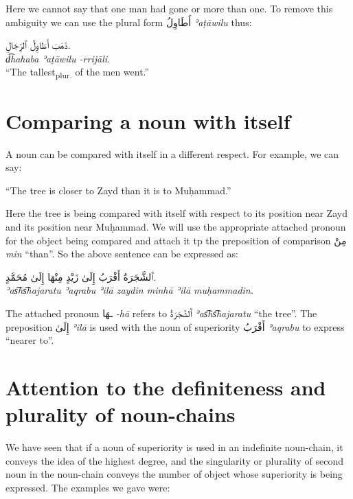 \documentclass[
  10pt,
]{book}
\begin{document}
Here we cannot say that one man had gone or more than one. To remove this ambiguity we can use the plural form \foreignlanguage{arabic}{أَطَاوِلُ} \emph{ʾaṭāwilu} thus:

\foreignlanguage{arabic}{ذَهَبَ أَطَاوِلُ ٱلرِّجَالِ.}\\
\emph{d͡hahaba ʾaṭāwilu -rrijāli.}\\
\enquote{The tallest\textsubscript{plur.} of the men went.}

\section{Comparing a noun with itself}\label{comparing-a-noun-with-itself}

A noun can be compared with itself in a different respect. For example, we can say:

\enquote{The tree is closer to Zayd than it is to Muḥammad.}

Here the tree is being compared with itself with respect to its position near Zayd and its position near Muḥammad. We will use the appropriate attached pronoun for the object being compared and attach it tp the preposition of comparison \foreignlanguage{arabic}{مِنْ} \emph{min} \enquote{than}. So the above sentence can be expressed as:

\foreignlanguage{arabic}{ٱَلشَّجَرَةُ أَقْرَبُ إِلَىٰ زَيْدٍ مِنْهَا إِلَىٰ مُحَمَّدٍ.}\\
\emph{ʾas͡hs͡hajaratu ʾaqrabu ʾilā zaydin minhā ʾilā muḥammadin.}

The attached pronoun \foreignlanguage{arabic}{ـهَا} \emph{-hā} refers to \foreignlanguage{arabic}{ٱَلشَّجَرَةُ} \emph{ʾas͡hs͡hajaratu} \enquote{the tree}.
The preposition \foreignlanguage{arabic}{إِلَىٰ} \emph{ʾilā} is used with the noun of superiority \foreignlanguage{arabic}{أَقْرَبُ} \emph{ʾaqrabu} to express \enquote{nearer to}.

\section{Attention to the definiteness and plurality of noun-chains}\label{attention-to-the-definiteness-and-plurality-of-noun-chains}

We have seen that if a noun of superiority is used in an indefinite noun-chain, it conveys the idea of the highest degree, and the singularity or plurality of second noun in the noun-chain conveys the number of object whose superiority is being expressed. The examples we gave were:
\end{document}

